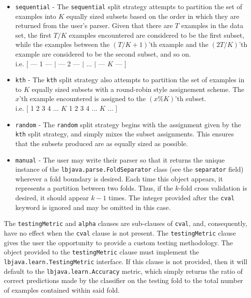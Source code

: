 \begin{itemize}
\item {\tt sequential} -
  The {\tt sequential} split strategy attempts to partition the set of
  examples into $K$ equally sized subsets based on the order in which they are
  returned from the user's parser. Given that there are $T$ examples in the
  data set, the first $T/K$ examples encountered are considered to be the
  first subset, while the examples between the $(T/K+1)$'th example and the
  $(2T/K)$'th example are considered to be the second subset, and so on. \\
  i.e. [ --- 1 --- $|$ --- 2 --- $| $ ... $|$ --- $K$ --- ]

\item {\tt kth} -
  The {\tt kth} split strategy also attempts to partition the set of examples
  in to $K$ equally sized subsets with a round-robin style assignement scheme.
  The $x$'th example encountered is assigned to the $(x\%K)$'th subset. \\
  i.e. [ 1 2 3 4 ... $K$ 1 2 3 4 ... $K$ ... ]

\item {\tt random} -
  The {\tt random} split strategy begins with the assignment given by the
  {\tt kth} split strategy, and simply mixes the subset assignments. This
  ensures that the subsets produced are as equally sized as possible.

\item {\tt manual} -
  The user may write their parser so that it returns the unique instance of
  the {\tt lbjava.parse.FoldSeparator} class (see the {\tt separator} field)
  wherever a fold boundary is desired.  Each time this object appears, it
  represents a partition between two folds.  Thus, if the $k$-fold cross
  validation is desired, it should appear $k-1$ times.  The integer provided
  after the {\tt cval} keyword is ignored and may be omitted in this case.

\end{itemize}

The {\tt testingMetric} and {\tt alpha} clauses are sub-clauses of {\tt cval},
and, consequently, have no effect when the {\tt cval} clause is not present.  The
{\tt testingMetric} clause gives the user the opportunity to provide a custom
testing methodology. The object provided to the {\tt testingMetric} clause
must implement the {\tt lbjava.learn.TestingMetric} interface.  If this clause
is not provided, then it will default to the {\tt lbjava.learn.Accuracy} metric,
which simply returns the ratio of correct predictions made by the classifier
on the testing fold to the total number of examples contained within said
fold.\\

